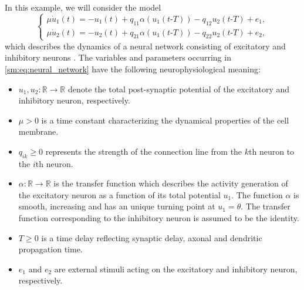 In this example, we will consider the model 
\begin{equation}
\label{sm:eq:neural_network}
\begin{cases}
\mu\dot{u}_1(t) = -u_1(t) + q_{11}\alpha(u_1(t\text{-}T))-q_{12}u_2(t\text{-}T) + e_1,\\
\mu\dot{u}_2(t) = -u_2(t) + q_{21}\alpha(u_1(t\text{-}T))-q_{22}u_2(t\text{-}T) + e_2,
\end{cases}
\end{equation}
which describes the dynamics of a neural network consisting of
excitatory and inhibitory neurons \cite{giannakopoulos2001bifurcations}.
The variables and parameters occurring in \cref{sm:eq:neural_network}
have the following neurophysiological meaning:
\begin{itemize}
\item $u_1,u_2:\mathbb{R}\rightarrow\mathbb{R}$ denote the total post-synaptic
potential of the excitatory and inhibitory neuron, respectively.
\item $\mu>0$ is a time constant characterizing the dynamical properties
of the cell membrane.
\item $q_{ik}\geq0$ represents the strength of the connection line from
the $k$th neuron to the $i$th neuron.
\item $\alpha:\mathbb{R}\rightarrow\mathbb{R}$ is the transfer function
which describes the activity generation of the excitatory neuron as
a function of its total potential $u_1$. The function $\alpha$
is smooth, increasing and has an unique turning point at $u_1 = \theta$.
The transfer function corresponding to the inhibitory neuron is assumed
to be the identity.
\item $T\geq0$ is a time delay reflecting synaptic delay, axonal and dendritic
propagation time.
\item $e_1$ and $e_2$ are external stimuli acting on the excitatory
and inhibitory neuron, respectively.
\end{itemize}

